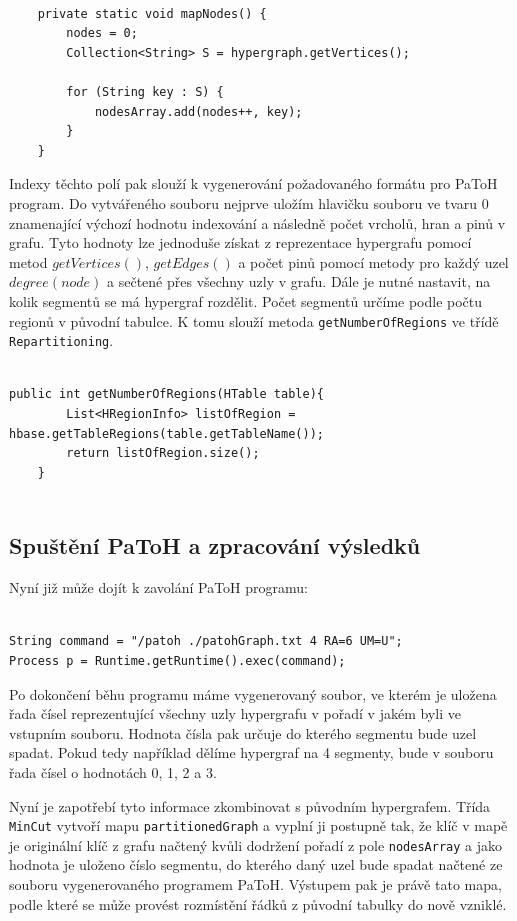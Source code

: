 \documentclass[thesis=M,czech]{FITthesis}[2012/06/26]
\begin{document}
\begin{lstlisting}[frame=single]  % Start your code-block
    
    private static void mapNodes() {
        nodes = 0;
        Collection<String> S = hypergraph.getVertices();

        for (String key : S) {
            nodesArray.add(nodes++, key);
        }
    }
\end{lstlisting}

Indexy těchto polí pak slouží k vygenerování požadovaného formátu pro PaToH program. Do vytvářeného souboru nejprve uložím hlavičku souboru ve tvaru 0 znamenající výchozí hodnotu indexování a následně počet vrcholů, hran a pinů v grafu. Tyto hodnoty lze jednoduše získat z reprezentace hypergrafu pomocí metod $getVertices()$, $getEdges()$ a počet pinů pomocí metody pro každý uzel $degree(node)$ a sečtené přes všechny uzly v grafu.
Dále je nutné nastavit, na kolik segmentů se má hypergraf rozdělit. Počet segmentů určíme podle počtu regionů v původní tabulce. K tomu slouží metoda \texttt{getNumberOfRegions} ve třídě \texttt{Repartitioning}.
\begin{lstlisting}[frame=single]  % Start your code-block

public int getNumberOfRegions(HTable table){
        List<HRegionInfo> listOfRegion = hbase.getTableRegions(table.getTableName());
        return listOfRegion.size();
    }


\end{lstlisting}
\subsection{Spuštění PaToH a zpracování výsledků}
Nyní již může dojít k zavolání PaToH programu:
\begin{lstlisting}[frame=single]  % Start your code-block

String command = "/patoh ./patohGraph.txt 4 RA=6 UM=U";
Process p = Runtime.getRuntime().exec(command);
\end{lstlisting}

Po dokončení běhu programu máme vygenerovaný soubor, ve kterém je uložena řada čísel reprezentující všechny uzly hypergrafu v pořadí v jakém byli ve vstupním souboru. Hodnota čísla pak určuje do kterého segmentu bude uzel spadat. Pokud tedy například dělíme hypergraf na 4 segmenty, bude v souboru řada čísel o hodnotách 0, 1, 2 a 3. 

Nyní je zapotřebí tyto informace zkombinovat s původním hypergrafem. Třída \texttt{MinCut} vytvoří mapu \texttt{partitionedGraph} a vyplní ji postupně tak, že klíč v mapě je originální klíč z grafu načtený kvůli dodržení pořadí z pole \texttt{nodesArray} a jako hodnota je uloženo číslo segmentu, do kterého daný uzel bude spadat načtené ze souboru vygenerovaného programem PaToH. Výstupem  pak je právě tato mapa, podle které se může provést rozmístění řádků z původní tabulky do nově vzniklé.
\end{document}
